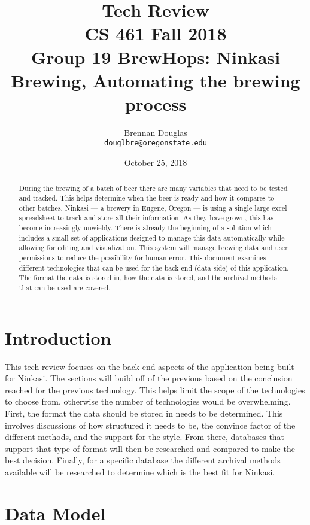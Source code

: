 \documentclass[draftclsnofoot,onecolumn,journal,letterpaper,compsoc,10pt]{IEEEtran}
\title{Tech Review\\\large CS 461 Fall 2018\\Group 19 BrewHops: Ninkasi Brewing, Automating the brewing process}
\author{
    Brennan Douglas \\
    \texttt{douglbre@oregonstate.edu}
}
\date{October 25, 2018}
\begin{document}
\begin{titlingpage}
    \maketitle
    \begin{abstract}
    	During the brewing of a batch of beer there are many variables that need to be tested and tracked. This helps determine when the beer is ready and how it compares to other batches. Ninkasi --- a brewery in Eugene, Oregon --- is using a single large excel spreadsheet to track and store all their information. As they have grown, this has become increasingly unwieldy. There is already the beginning of a solution which includes a small set of applications designed to manage this data automatically while allowing for editing and visualization. This system will manage brewing data and user permissions to reduce the possibility for human error. This document examines different technologies that can be used for the back-end (data side) of this application.  The format the data is stored in, how the data is stored, and the archival methods that can be used are covered.
    \end{abstract}
    \pagebreak
    \tableofcontents
\end{titlingpage}

\section{Introduction}

This tech review focuses on the back-end aspects of the application being built for Ninkasi.  The sections will build off of the previous based on the conclusion reached for the previous technology.  This helps limit the scope of the technologies to choose from, otherwise the number of technologies would be overwhelming.  First, the format the data should be stored in needs to be determined.  This involves discussions of how structured it needs to be, the convince factor of the different methods, and the support for the style.  From there, databases that support that type of format will then be researched and compared to make the best decision.  Finally, for a specific database the different archival methods available will be researched to determine which is the best fit for Ninkasi.

\section{Data Model}
\end{document}
